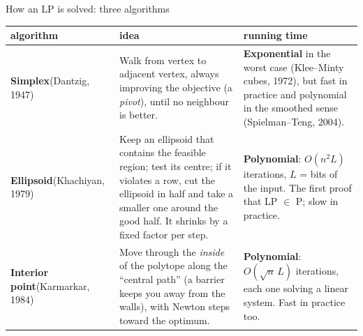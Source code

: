 \documentclass[aspectratio=169,11pt]{beamer}
\begin{document}
\begin{frame}{How an LP is solved: three algorithms}
\footnotesize
\renewcommand{\arraystretch}{1.25}
\begin{tabular}{>{\raggedright\arraybackslash}p{24mm}>{\raggedright\arraybackslash}p{62mm}>{\raggedright\arraybackslash}p{48mm}}\toprule
algorithm & idea & running time\\\midrule
\textbf{Simplex}\newline(Dantzig, 1947)
  & Walk from vertex to adjacent vertex, always improving the objective (a \emph{pivot}), until no neighbour is better.
  & \textbf{Exponential} in the worst case (Klee--Minty cubes, 1972), but fast in practice and polynomial in the smoothed
    sense (Spielman--Teng, 2004).\\
\textbf{Ellipsoid}\newline(Khachiyan, 1979)
  & Keep an ellipsoid that contains the feasible region; test its centre; if it violates a row, cut the ellipsoid in half
    and take a smaller one around the good half. It shrinks by a fixed factor per step.
  & \textbf{Polynomial}: $O(n^2 L)$ iterations, $L$ = bits of the input. The first proof that LP $\in$ P; slow in practice.\\
\textbf{Interior point}\newline(Karmarkar, 1984)
  & Move through the \emph{inside} of the polytope along the ``central path'' (a barrier keeps you away from the walls),
    with Newton steps toward the optimum.
  & \textbf{Polynomial}: $O(\sqrt{n}\,L)$ iterations, each one solving a linear system. Fast in practice too.\\\bottomrule
\end{tabular}

\end{frame}
\end{document}
